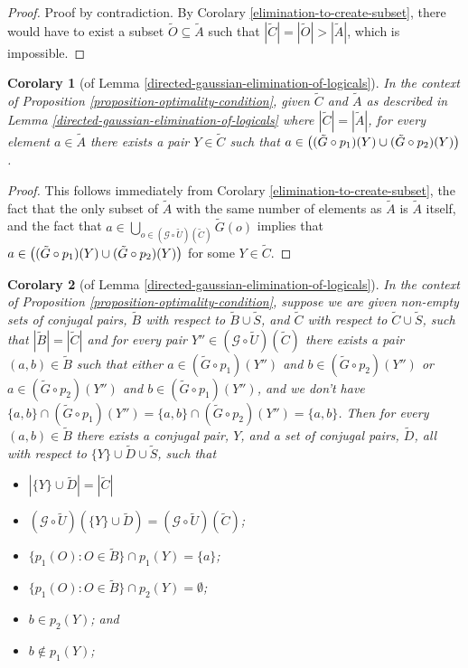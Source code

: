 \documentclass[twocolumn,showpacs,preprintnumbers,amsmath,amssymb,nofootinbib,pra,floatfix]{revtex4-1}
\newtheorem{corolary}{Corolary}
\newcommand{\set}{\tilde}
\newcommand{\genfun}{\mathcal{G}}
\begin{document}
\begin{proof}
Proof by contradiction.  By Corolary \ref{elimination-to-create-subset}, there would have to exist a subset $\set O\subseteq\set A$ such that $|\set C|=|\set O|>|\set A|$, which is impossible.
\end{proof}
\begin{corolary}[of Lemma \ref{directed-gaussian-elimination-of-logicals}]
\label{all-are-present}
In the context of Proposition \ref{proposition-optimality-condition}, given $\set C$ and $\set A$ as described in Lemma \ref{directed-gaussian-elimination-of-logicals} where $|\set C|=|\set A|$, for every element $a\in\set A$ there exists a pair $Y\in\set C$ such that $a\in\paren{(\set G\circ p_1)(Y)\cup(\set G\circ p_2)(Y)}$.
\end{corolary}

\begin{proof}
This follows immediately from Corolary \ref{elimination-to-create-subset}, the fact that the only subset of $\set A$ with the same number of elements as $\set A$ is $\set A$ itself, and the fact that $a\in\bigcup_{o\in(\genfun\circ\set U)(\set C)} \set G(o)$ implies that $a\in\paren{(\set G\circ p_1)(Y)\cup(\set G\circ p_2)(Y)}$ for some $Y\in\set C$.
\end{proof}
\begin{corolary}[of Lemma \ref{directed-gaussian-elimination-of-logicals}]
\label{elimination-to-isolate}
In the context of Proposition \ref{proposition-optimality-condition}, suppose we are given non-empty sets of conjugal pairs, $\set B$ with respect to $\set B\cup\set S$, and $\set C$ with respect to $\set C\cup\set S$, such that $|\set B|=|\set C|$ and for every pair $Y''\in(\genfun\circ\set U)(\set C)$ there exists a pair $(a,b)\in\set B$ such that either $a\in (\set G\circ p_1)(Y'')$ and $b\in (\set G\circ p_2)(Y'')$ or $a\in (\set G\circ p_2)(Y'')$ and $b\in (\set G\circ p_1)(Y'')$, and we don't have $\{a,b\}\cap(\set G\circ p_1)(Y'')=\{a,b\}\cap(\set G\circ p_2)(Y'')=\{a,b\}$.  Then for every $(a,b)\in\set B$ there exists a conjugal pair, $Y$, and a set of conjugal pairs, $\set D$, all with respect to $\{Y\}\cup\set D\cup\set S$, such that
\begin{itemize}
\item $|\{Y\}\cup \set D| = |\set C|$
\item $(\genfun\circ\set U)(\{Y\}\cup \set D)=(\genfun\circ\set U)(\set C)$;
\item $\{p_1(O):O\in\set B\}\cap p_1(Y)=\{a\}$;
\item $\{p_1(O):O\in\set B\}\cap p_2(Y)=\emptyset$;
\item $b\in p_2(Y)$; and
\item $b\notin p_1(Y)$;
\end{itemize}
\end{corolary}
\end{document}
